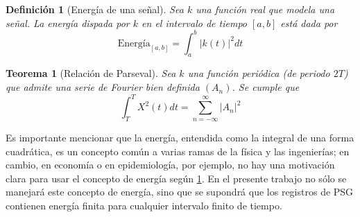 \documentclass[12pt,a4paper]{mitthesis}
\newtheorem{defn}{Definici\'on}
\newtheorem{thrm}{Teorema}
\newcommand{\abso}[1]{\left| #1 \right|}
\begin{document}
\begin{defn}[Energ\'ia de una se\~nal]
Sea $k$ una funci\'on real que modela una se\~nal. La energ\'ia dispada por $k$ en el intervalo de
tiempo $[a,b]$ est\'a dada por
\begin{equation*}
\text{Energ\'ia}_{[a,b]} = 
\int_{a}^{b} \abso{k\left(t\right)}^{2} dt
\end{equation*}
\label{energia}
\end{defn}

\begin{thrm}[Relaci\'on de Parseval]
Sea $k$ una funci\'on peri\'odica (de periodo $2T$) que admite una serie de Fourier bien definida
$(A_n)$. Se cumple que
\begin{equation*}
\int_T^{T} X^{2}(t) dt = \sum_{n=-\infty}^{\infty} \abso{A_n}^{2}
\end{equation*}
\label{parseval_serie}
\end{thrm}


Es importante mencionar que la energ\'ia, entendida como la integral de una forma cuadr\'atica, es 
un concepto
com\'un a varias ramas de la f\'isica y las ingenier\'ias; en cambio,
en econom\'ia o en epidemiolog\'ia, por ejemplo, no hay una motivaci\'on clara para usar el concepto
de energ\'ia seg\'un \ref{energia}.
En el presente trabajo no s\'olo se manejar\'a este concepto de energ\'ia, sino que se supondr\'a
que los registros de PSG contienen energ\'ia finita para cualquier intervalo finito de tiempo.

\end{document}

